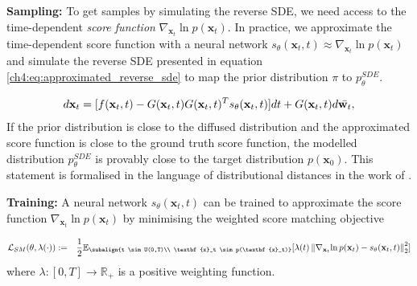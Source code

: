\textbf{Sampling:} To get samples by simulating the reverse SDE, we need access to the time-dependent \textit{score function} $\nabla_{\textbf{x}_t}{\ln{p(\textbf{x}_t)}}$. In practice, we approximate the time-dependent score function with a neural network $s_{\theta}(\textbf{x}_t,t) \approx \nabla_{\textbf{x}_t}{\ln{p(\textbf{x}_t)}}$ and simulate the reverse SDE presented in equation \ref{ch4:eq:approximated_reverse_sde} to map the prior distribution $\pi$ to $p^{SDE}_{\theta}$.

\begin{gather}\label{ch4:eq:approximated_reverse_sde}
d\textbf{x}_t=[f(\textbf{x}_t,t)-G(\textbf{x}_t,t)G(\textbf{x}_t,t)^Ts_{\theta}(\textbf{x}_t,t)]dt + G(\textbf{x}_t,t)d\Bar{\textbf{w}_t},
\end{gather}If the prior distribution is close to the diffused distribution and the approximated score function is close to the ground truth score function, the modelled distribution  $p^{SDE}_{\theta}$ is provably close to the target distribution $p(\textbf{x}_0)$. This statement is formalised in the language of distributional distances in the work of \cite{song2021maximum}. 




\textbf{Training:} A neural network $s_\theta(\textbf{x}_t,t)$ can be trained to approximate the score function $\nabla_{\textbf{x}_t}{\ln{p(\textbf{x}_t)}}$ by minimising the weighted score matching objective

\begin{gather}
\begin{aligned}
    &\mathcal{L}_{SM}(\theta, \lambda(\cdot)) := 
    &\frac{1}{2} \mathbb{E}_{\subalign{t \sim U(0,T)\\ \textbf{x}_t \sim p(\textbf{x}_t)}} [\lambda(t) \norm{\nabla_{\textbf{x}_t}{\ln{p(\textbf{x}_t)}} - s_\theta(\textbf{x}_t,t)}_2^2]
\end{aligned}
\end{gather}
where $\lambda: [0,T] \xrightarrow{} \mathbb{R}_+$ is a positive weighting function.

